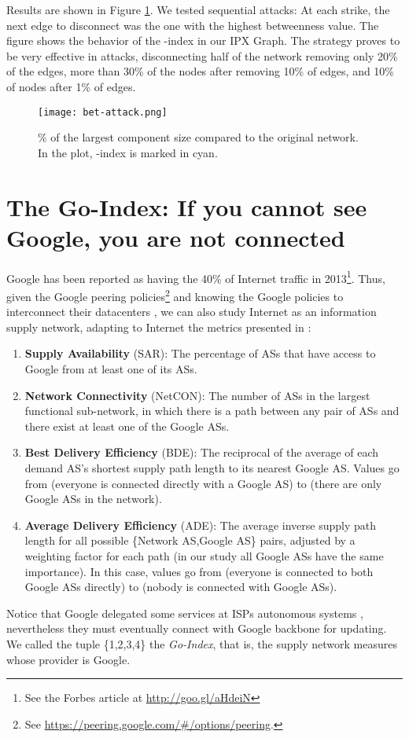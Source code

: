 \documentclass{sig-alternate-10pt}
\begin{document}
Results are shown in Figure \ref{fig:bet-attack}. We tested sequential attacks: At each strike, the next edge to disconnect was the one with the highest betweenness value.  The figure shows the behavior of the -index in our IPX Graph. The strategy proves to be very effective in attacks, disconnecting half of the network removing only 20\% of the edges, more than 30\% of the nodes after removing 10\% of edges, and 10\% of nodes after 1\% of edges.


\begin{figure}[th!]
  \centering
  \texttt{[image: bet-attack.png]}
  \caption{\% of the largest component size compared to the original network. In the plot, -index is marked in cyan.}
  \label{fig:bet-attack}
\end{figure}

\section{The Go-Index: If you cannot see Google, you are not connected}
\label{go}

Google has been reported as having the 40\% of Internet traffic in 2013\footnote{See the Forbes article at \url{http://goo.gl/aHdeiN}}. Thus, given the Google peering policies\footnote{See \url{https://peering.google.com/#/options/peering}.} and knowing the Google policies to interconnect their datacenters \cite{jain2013b4}, we can also study Internet as an information supply network, adapting to Internet the metrics presented in \cite{zhao2011achieving}:
\begin{enumerate}
\item \textbf{Supply Availability} (SAR): The percentage of ASs that have access to Google from at least one of its ASs.
\item \textbf{Network Connectivity} (NetCON): The number of ASs in the largest functional sub-network, in which there is a path between any pair of ASs and there exist at least one of the Google ASs.
\item \textbf{Best Delivery Efficiency} (BDE): The reciprocal of the average of each demand AS's shortest supply path length to its nearest Google AS.  Values go from  (everyone is connected directly with a Google AS) to  (there are only Google ASs in the network).
\item \textbf{Average Delivery Efficiency} (ADE): The average inverse supply path length for all possible \{Network AS,Google AS\} pairs, adjusted by a weighting factor for each path (in our study all Google ASs have the same importance). In this case, values go from  (everyone is connected to both Google ASs directly) to  (nobody is connected with Google ASs).
\end{enumerate}
Notice that Google delegated some services at ISPs autonomous systems \cite{calder2013mapping}, nevertheless they must eventually connect with  Google backbone for updating.  We called the tuple \{1,2,3,4\} the \textit{Go-Index}, that is, the supply network measures whose provider is Google. 
\end{document}
